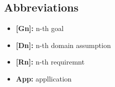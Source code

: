 \subsection{Abbreviations }
	\begin{itemize}
		\item {\textbf{[Gn]:} n-th goal}
		\item {\textbf{[Dn]:} n-th domain assumption}
		\item {\textbf{[Rn]:} n-th requiremnt}
		\item{\textbf{App:} appllication}
	\end{itemize}


